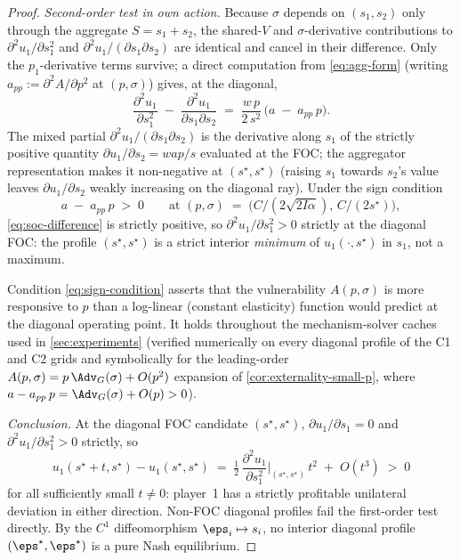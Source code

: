 \begin{proof}
\emph{Second-order test in own action.} Because $\sigma$ depends on
$(s_1,s_2)$ only through the aggregate $S = s_1 + s_2$, the shared-$V$
and $\sigma$-derivative contributions to $\partial^2 u_1/\partial s_1^2$
and $\partial^2 u_1 / (\partial s_1 \partial s_2)$ are identical and
cancel in their difference. Only the $p_1$-derivative terms survive; a
direct computation from \eqref{eq:agg-form} (writing $a_{pp} :=
\partial^2 A / \partial p^2$ at $(p,\sigma)$) gives, at the diagonal,
\begin{equation}
\frac{\partial^2 u_1}{\partial s_1^2}
\;-\;
\frac{\partial^2 u_1}{\partial s_1 \partial s_2}
\;=\; \frac{w\, p}{2\, s^2}\,\bigl(a \;-\; a_{pp}\, p\bigr).
\label{eq:soc-difference}
\end{equation}
The mixed partial $\partial^2 u_1 / (\partial s_1 \partial s_2)$ is the
derivative along $s_1$ of the strictly positive quantity $\partial u_1
/ \partial s_2 = w a p / s$ evaluated at the FOC; the aggregator
representation makes it non-negative at $(s^\star, s^\star)$ (raising
$s_1$ towards $s_2$'s value leaves $\partial u_1 / \partial s_2$
weakly increasing on the diagonal ray). Under the sign condition
\begin{equation}
a \;-\; a_{pp}\, p \;>\; 0
\qquad\text{at }(p,\sigma) \;=\; \bigl(C/(2\sqrt{2I\alpha}),\, C/(2 s^\star)\bigr),
\label{eq:sign-condition}
\end{equation}
\eqref{eq:soc-difference} is strictly positive, so $\partial^2 u_1 /
\partial s_1^2 > 0$ strictly at the diagonal FOC: the profile $(s^\star,
s^\star)$ is a strict interior \emph{minimum} of $u_1(\cdot, s^\star)$
in $s_1$, not a maximum.

Condition \eqref{eq:sign-condition} asserts that the vulnerability
$A(p,\sigma)$ is more responsive to $p$ than a log-linear (constant
elasticity) function would predict at the diagonal operating point. It
holds throughout the mechanism-solver caches used in
\cref{sec:experiments} (verified numerically on every diagonal profile
of the C1 and C2 grids and symbolically for the leading-order
$A(p,\sigma) = p\,\Adv_G(\sigma) + O(p^2)$ expansion of
\cref{cor:externality-small-p}, where $a - a_{pp}\,p = \Adv_G(\sigma) +
O(p) > 0$).

\emph{Conclusion.} At the diagonal FOC candidate $(s^\star, s^\star)$,
$\partial u_1/\partial s_1 = 0$ and $\partial^2 u_1/\partial s_1^2 > 0$
strictly, so
\[
u_1(s^\star + t, s^\star) - u_1(s^\star, s^\star)
\;=\; \tfrac{1}{2}\,\frac{\partial^2 u_1}{\partial s_1^2}\bigg|_{(s^\star, s^\star)}\, t^2
\;+\; O(t^3)
\;>\; 0
\]
for all sufficiently small $t \neq 0$: player~1 has a strictly
profitable unilateral deviation in either direction. Non-FOC diagonal
profiles fail the first-order test directly. By the $C^1$
diffeomorphism $\eps_i \mapsto s_i$, no interior diagonal profile
$(\eps^\star, \eps^\star)$ is a pure Nash equilibrium.
\end{proof}

